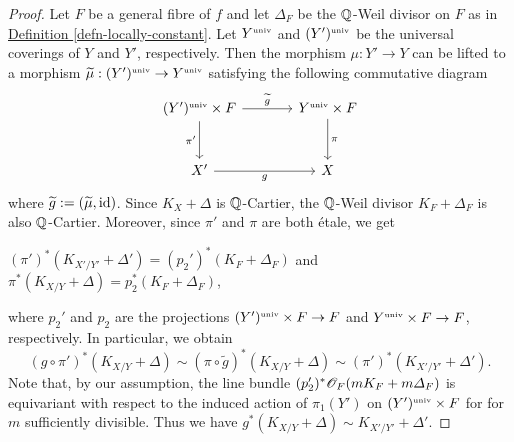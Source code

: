 \begin{proof}
	Let $F$ be a general fibre of $f$ and let $\Delta_F$ be the $\mathbb Q$-Weil divisor on $F$ as  in {\hyperref[defn-locally-constant]{Definition  \ref*{defn-locally-constant}}}. 
	Let $Y^{\text{\tiny univ}}$ and $(Y')^{\text{\tiny univ}}$ be the universal coverings of $Y$ and $Y'$, respectively. Then the morphism $\mu:Y'\rightarrow Y$ can be lifted to a morphism $\widetilde{\mu}:(Y')^{\text{\tiny univ}}\rightarrow Y^{\text{\tiny univ}}$ satisfying the following commutative diagram
	\[
	\begin{tikzcd}[column sep=large, row sep=large]
		(Y')\univ\times F \arrow[r,"\widetilde{g}"] \arrow[d,"\pi'" left]  
		    & Y\univ \times F  \arrow[d,"\pi"]  \\
		X' \arrow[r,"g" below]
		    & X
	\end{tikzcd}
	\]
	where $\widetilde{g}:=(\widetilde{\mu},\textup{id})$. Since $K_X+\Delta$ is $\mathbb Q$-Cartier, the $\mathbb Q$-Weil divisor $K_F+\Delta_F$ is also $\mathbb Q$-Cartier. Moreover, since $\pi'$ and $\pi$ are both \'etale, we get
	\begin{center}
		$(\pi')^*(K_{X'/Y'}+\Delta')=(p_2')^*(K_F+\Delta_F)$ \quad and \quad $\pi^*(K_{X/Y}+\Delta)=p_2^*(K_F+\Delta_F)$,
	\end{center}
    where $p_2'$ and $p_2$ are the projections $(Y')^{\text{\tiny univ}}\times F\rightarrow F$ and $Y^{\text{\tiny univ}}\times F\rightarrow F$, respectively. 
    In particular, we obtain
    \[
    (g\circ \pi')^*(K_{X/Y}+\Delta) \sim (\pi\circ \widetilde{g})^*(K_{X/Y}+\Delta) \sim (\pi')^*(K_{X'/Y'}+\Delta').
    \]
    Note that, by our assumption, the line bundle $(p'_2)^*\mathscr O_{F}(mK_F+m\varDelta_F)$ is equivariant with respect to the induced action of $\pi_1(Y')$ on $(Y')^{\text{\tiny univ}}\times F$ for 
     for $m$ sufficiently divisible. Thus we have $g^*(K_{X/Y}+\Delta)\sim K_{X'/Y'}+\Delta'$. 
\end{proof}


\baselineskip

















